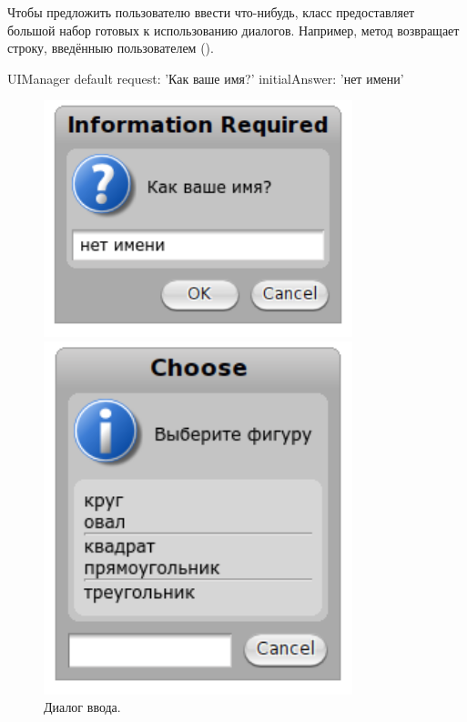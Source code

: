 \documentclass[a4paper,10pt,twoside]{book}
\begin{document}
Чтобы предложить пользователю ввести что-нибудь, класс  предоставляет большой набор готовых к использованию диалогов.
Например, метод  возвращает строку, введённыю пользователем ().
\begin{code}{}
UIManager default request: 'Как ваше имя?' initialAnswer: 'нет имени'
\end{code}

\begin{figure}[htb]
\begin{minipage}{0.48\textwidth}
	\centerline{\includegraphics[width=0.8\textwidth]{dialog-ru}}
	\caption{Диалог ввода.}\figlabel{dialogName}
\end{minipage}
\hfill
\begin{minipage}{0.48\textwidth}
	\vfill
	\centerline{\includegraphics [width=0.8\textwidth]{popup-ru}}

\end{minipage}
\end{figure}
\end{document}

